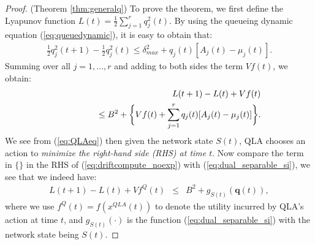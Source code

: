 \documentclass[journal]{IEEEtran}
\newcommand{\bv}[1]{{\boldsymbol{#1} }}
\begin{document}
\begin{proof} (Theorem \ref{thm:generalq}) 
To prove the theorem, we first define the Lyapunov function $L(t)=\frac{1}{2}\sum_{j=1}^{r}q_j^2(t)$. 
By using the queueing dynamic equation (\ref{eq:queuedynamic}), it is easy to obtain that:
\begin{eqnarray*}
\frac{1}{2}q_j^2(t+1)-\frac{1}{2}q_j^2(t) \leq \delta_{max}^2 + q_j(t) [A_j(t)-\mu_j(t)].
\end{eqnarray*}
Summing over all $j=1, ..., r$ and adding to both sides the term $Vf(t)$, we obtain:
\begin{eqnarray}
\hspace{-.3in}&& L(t+1)-L(t) + Vf(t)\label{eq:driftcompute_noexp} \\
\hspace{-.3in}&&\qquad\qquad\qquad\leq B^2 + \bigg\{Vf(t) + \sum_{j=1}^rq_j(t) [A_j(t)-\mu_j(t)]\bigg\}. \nonumber
\end{eqnarray}
We see from (\ref{eq:QLAeq}) then given the network state $S(t)$, QLA chooses an action to \emph{minimize the right-hand side (RHS) at time $t$}. Now compare the term in $\{\}$ in the RHS of (\ref{eq:driftcompute_noexp}) with (\ref{eq:dual_separable_si}), we see that we indeed have:
\begin{eqnarray}
L(t+1)-L(t) + Vf^Q(t) &\leq& B^2 + g_{S(t)}(\bv{q}(t)), \label{eq:samplepath_drift_dual}
\end{eqnarray}
where we use $f^Q(t)=f(x^{QLA}(t))$ to denote the utility incurred by QLA's action at time $t$, and $g_{S(t)}(\cdot)$ is the function (\ref{eq:dual_separable_si}) with the network state being $S(t)$.


\end{proof}
\end{document}
